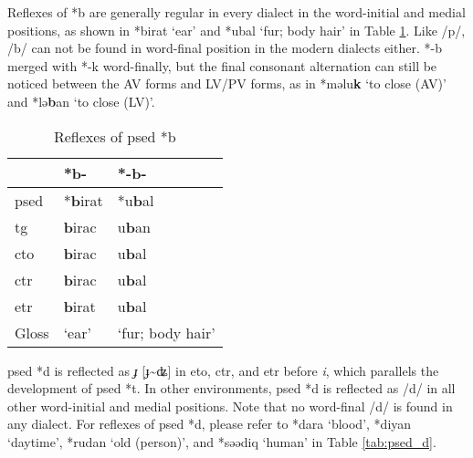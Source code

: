Reflexes of *b are generally regular in every dialect in the word-initial and medial positions, as shown in *birat `ear' and *ubal `fur; body hair' in Table \ref{tab:psed_b}. Like /p/, /b/ can not be found in word-final position in the modern dialects either. *-b merged with *-k word-finally, but the final consonant alternation can still be noticed between the AV forms and LV/PV forms, as in *məlu\textbf{k} `to close (AV)' and *lə\textbf{b}an `to close (LV)'. 

\begin{table}[!htbp]
\centering
\caption{Reflexes of \acl{psed} *b}
\label{tab:psed_b}
\begin{tabular}{lll}
\hline
           & *b-    & *-b-             \\ \hline
\acs{psed} & *\textbf{b}irat & *u\textbf{b}al            \\ \hdashline
\acs{tg}   & \textbf{b}irac  & u\textbf{b}an             \\
\acs{cto}  & \textbf{b}irac  & u\textbf{b}al             \\
\acs{ctr}  & \textbf{b}irac  & u\textbf{b}al             \\
\acs{etr}  & \textbf{b}irat  & u\textbf{b}al             \\ \hline
Gloss      & `ear'  & `fur; body hair' \\ \hline
\end{tabular}
\end{table}

\acl{psed} *d is reflected as \textit{ɟ} [ɟ\~{ }ʥ] in \acl{eto}, \acl{ctr}, and \acl{etr} before \textit{i}, which parallels the development of \acl{psed} *t. In other environments, \acl{psed} *d is reflected as /d/ in all other word-initial and medial positions. Note that no word-final /d/ is found in any dialect. For reflexes of \acl{psed} *d, please refer to *dara `blood', *diyan `daytime', *rudan `old (person)', and *səədiq `human' in Table \ref{tab:psed_d}. 

